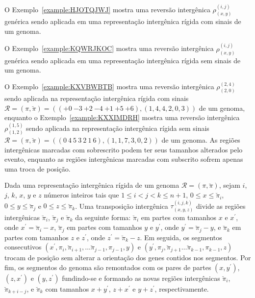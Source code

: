 O Exemplo~\ref{example:HJOTQJWJ} mostra uma reversão intergênica $\rho^{(i, j)}_{(x, y)}$ genérica sendo aplicada em uma representação intergênica rígida com sinais de um genoma.



O Exemplo~\ref{example:KQWRJKOC} mostra uma reversão intergênica $\rho^{(i, j)}_{(x, y)}$ genérica sendo aplicada em uma representação intergênica rígida sem sinais de um genoma.

\pagebreak



O Exemplo~\ref{example:KXVBWBTB} mostra uma reversão intergênica $\rho^{(2,4)}_{(2,0)}$ sendo aplicada na representação intergênica rígida com sinais $\mathcal{R} = (\pi,\breve\pi) = \allowbreak(({+0}~{-3}~{+2}~{-4}~{+1}~{+5}~{+6}),\allowbreak(1,4,4,2,0,3))$ de um genoma, enquanto o Exemplo~\ref{example:KXXIMDRH} mostra uma reversão intergênica $\rho^{(1,5)}_{(1,2)}$ sendo aplicada na representação intergênica rígida sem sinais $\mathcal{R} = (\pi,\breve\pi) = \allowbreak(({0}~{4}~{5}~{3}~{2}~{1}~{6}),\allowbreak(1,1,7,3,0,2))$ de um genoma. As regiões intergênicas marcadas com sobrescrito podem ter seus tamanhos alterados pelo evento, enquanto as regiões intergênicas marcadas com subscrito sofrem apenas uma troca de posição.





\begin{definition}
Dada uma representação intergênica rígida de um genoma $\mathcal{R} = (\pi,\breve\pi)$, sejam $i$, $j$, $k$, $x$, $y$ e $z$ números inteiros tais que $1 \le i < j < k \le n+1$, $0 \le x \le \breve\pi_i$, $0 \le y \le \breve\pi_j$ e $0 \le z \le \breve\pi_k$. Uma transposição intergênica $\tau^{(i,j,k)}_{(x,y,z)}$ divide as regiões intergênicas $\breve\pi_i$, $\breve\pi_{j}$ e $\breve\pi_k$ da seguinte forma: $\breve\pi_i$ em partes com tamanhos $x$ e $x^{\prime}$, onde $x^{\prime}=\breve\pi_i-x$, $\breve\pi_{j}$ em partes com tamanhos $y$ e $y^{\prime}$, onde $y^{\prime}=\breve\pi_{j}-y$, e $\breve\pi_{k}$ em partes com tamanhos $z$ e $z^{\prime}$, onde $z^{\prime}=\breve\pi_{k}-z$. Em seguida, os segmentos consecutivos $(x^{\prime},\pi_i,\breve\pi_{i+1},\dots \breve \pi_{j-1},\pi_{j-1},y)$ e $(y^{\prime},\pi_j,\breve\pi_{j+1}\dots \breve\pi_{k-1},\pi_{k-1},z)$ trocam de posição sem alterar a orientação dos genes contidos nos segmentos. Por fim, os segmentos do genoma são remontados com os pares de partes $(x,y^{\prime})$, $(z,x^{\prime})$ e $(y,z^{\prime})$ fundindo-se e formando as novas regiões intergênicas $\breve\pi_{i}$, $\breve\pi_{k+i-j}$, e $\breve\pi_{k}$ com tamanhos $x + y^{\prime}$, $z + x^{\prime}$ e $y + z^{\prime}$, respectivamente.
\end{definition}

